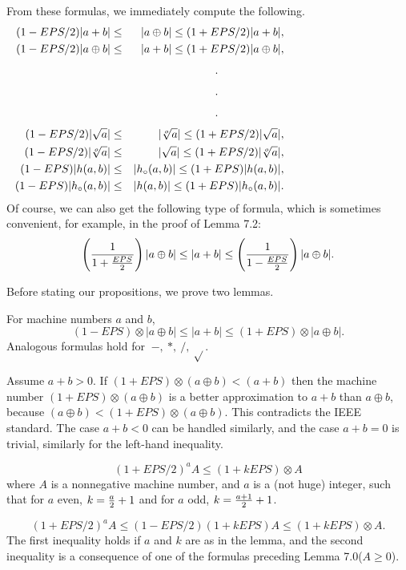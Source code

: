  
From these formulas, we immediately compute the following.
\begin{eqnarray*}
(1 - EPS/2) |a + b| &\leq& |a \oplus b| 
\leq (1 + EPS/2) |a+b|, \\ 
  (1 - EPS/2) |a \oplus b|& \leq& |a + b| 
\leq (1 + EPS/2) |a \oplus b|,\\
\noalign{\vskip4pt}
\noalign{\hfil .\hfil }  \noalign{\vskip4pt}
\noalign{\hfil .\hfil } \noalign{\vskip4pt}
\noalign{\hfil .\hfil } \noalign{\vskip4pt}
(1 - EPS/2) |\sqrt a| &\leq&  |\root o \of a| 
\leq (1 + EPS/2) |\sqrt a|, \\ (1 - EPS/2) |\root o \of a|&\leq&  |\sqrt a| 
\leq (1 + EPS/2) |\root o \of a|, \\  (1 - EPS) |h(a,b)| &\leq&  |h_\circ (a,b)| 
\leq (1 + EPS) |h(a,b)|, \\  (1 - EPS) |h_\circ (a,b)| &\leq& |h(a,b)| 
\leq (1 + EPS) |h_\circ (a,b)|.
\end{eqnarray*}
Of course, we can also get the following type of formula, which is sometimes convenient,
 for example, in the proof of Lemma 7.2:
$$\left({1 \over {1 + {EPS \over 2}}}\right) |a \oplus b| \leq |a + b| 
\leq \left({1 \over {1 - {EPS \over 2}}}\right) |a \oplus b|.$$

Before stating our propositions, we prove two lemmas.

For machine numbers $a$ and $b${\rm ,}
$$(1 - EPS) \otimes |a \oplus b| \le |a + b| \le (1 + EPS) \otimes |a \oplus b|.$$
 Analogous formulas hold for $\ -,\ *,\ /,\ \sqrt{}$.
\endproclaim

Assume $a+b > 0$.  
If $(1+EPS) \otimes (a \oplus b) < (a+b)$ then the machine number 
$(1+EPS) \otimes (a \oplus b)$ is a better approximation to $a+b$ than $a \oplus b$, because $(a \oplus b) 
< (1+EPS) \otimes (a \oplus b)$.  This contradicts the IEEE standard.  The case $a+b < 0$ can be handled similarly, and the
case $a+b = 0$ is trivial, similarly for the left-hand inequality.
\enddemo

 $$(1 + EPS/2)^a A \le (1 + k EPS) \otimes A$$ 
 where $A$ is a nonnegative machine number{\rm ,} and $a$ is a {\rm (}\/not huge\/{\rm )} integer{\rm ,} such that
for $a$ even{\rm ,} $k = {a \over 2} + 1$ and  for $a$ odd, $k = {a+1 \over 2} + 1$. 
\endproclaim

$$(1 + EPS/2)^a A\le (1 - EPS/2)(1 + k EPS) A \le (1 + k EPS) \otimes A.$$ 
The first inequality holds if $a$ and $k$ are as in the lemma, and the second inequality is a consequence of one of the
formulas preceding Lemma 7.0\break ($A \ge 0$). \enddemo
 
